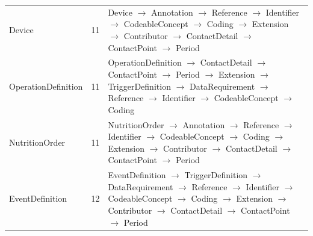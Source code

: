\begin{longtable}{lrl}
Device & 11 & Device $\rightarrow$ Annotation $\rightarrow$ Reference $\rightarrow$ Identifier $\rightarrow$ CodeableConcept $\rightarrow$ Coding $\rightarrow$ Extension $\rightarrow$ Contributor $\rightarrow$ ContactDetail $\rightarrow$ ContactPoint $\rightarrow$ Period \\
OperationDefinition & 11 & OperationDefinition $\rightarrow$ ContactDetail $\rightarrow$ ContactPoint $\rightarrow$ Period $\rightarrow$ Extension $\rightarrow$ TriggerDefinition $\rightarrow$ DataRequirement $\rightarrow$ Reference $\rightarrow$ Identifier $\rightarrow$ CodeableConcept $\rightarrow$ Coding \\
NutritionOrder & 11 & NutritionOrder $\rightarrow$ Annotation $\rightarrow$ Reference $\rightarrow$ Identifier $\rightarrow$ CodeableConcept $\rightarrow$ Coding $\rightarrow$ Extension $\rightarrow$ Contributor $\rightarrow$ ContactDetail $\rightarrow$ ContactPoint $\rightarrow$ Period \\
EventDefinition & 12 & EventDefinition $\rightarrow$ TriggerDefinition $\rightarrow$ DataRequirement $\rightarrow$ Reference $\rightarrow$ Identifier $\rightarrow$ CodeableConcept $\rightarrow$ Coding $\rightarrow$ Extension $\rightarrow$ Contributor $\rightarrow$ ContactDetail $\rightarrow$ ContactPoint $\rightarrow$ Period \\
\end{longtable}
